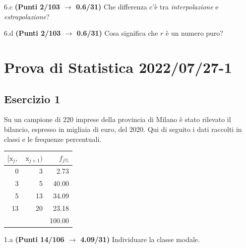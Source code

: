 \documentclass[
  11pt,
]{book}
\theoremstyle{mytheoremstyle}
\theoremstyle{mydefstyle}
\newenvironment{sol}
  {
  \begin{tcolorbox}[enhanced,breakable,arc=0.1mm,boxrule=1pt,colback=white,colframe=iblue,
  title=\bf \fontfamily{lmss}\selectfont \hspace{.5 cm} Soluzione,drop fuzzy shadow]

}{
\end{tcolorbox}
  }
\begin{document}
6.c \textbf{(Punti 2/103 \(\rightarrow\) 0.6/31)} Che differenza c'è tra \emph{interpolazione} e \emph{estrapolazione}?

6.d \textbf{(Punti 2/103 \(\rightarrow\) 0.6/31)} Cosa significa che \(r\) è un numero puro?

\section{Prova di Statistica 2022/07/27-1}\label{prova-di-statistica-20220727-1}

\subsection{Esercizio 1}\label{esercizio-1-16}

Su un campione di \(220\) imprese della provincia di Milano è stato
rilevato il bilancio, espresso in migliaia di euro, del 2020. Qui di seguito i dati raccolti in classi
e le frequenze percentuali.

\begin{sol}

\begin{table}[H]
\centering
\begin{tabular}{rrr}
\toprule
$[\text{x}_j,$ & $\text{x}_{j+1})$ & $f_{j\%}$\\
\midrule
0 & 3 & 2.73\\
3 & 5 & 40.00\\
5 & 13 & 34.09\\
13 & 20 & 23.18\\
 &  & 100.00\\
\bottomrule
\end{tabular}
\end{table}

\end{sol}

1.a \textbf{(Punti 14/106 \(\rightarrow\) 4.09/31)} Individuare la classe modale.
\end{document}
